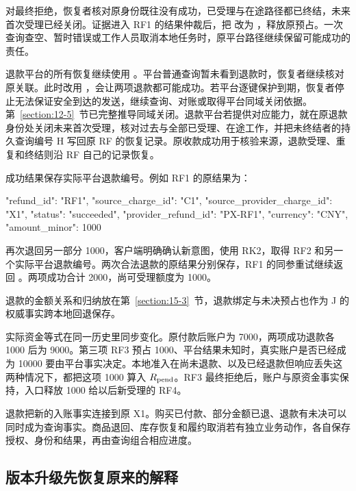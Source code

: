 对最终拒绝，恢复者核对原身份既往没有成功，已受理与在途路径都已终结，未来首次受理已经关闭。证据进入 RF1 的结果仲裁后，把  改为 ，释放原预占。一次查询查空、暂时错误或工作人员取消本地任务时，原平台路径继续保留可能成功的责任。


退款平台的所有恢复继续使用 。平台普通查询暂未看到退款时，恢复者继续核对原关联。此时改用 ，会让两项退款都可能成功。若平台逐键保护到期，恢复者停止无法保证安全到达的发送，继续查询、对账或取得平台同域关闭依据。第~\ref{section:12-5}~节已完整推导同域关闭。退款平台若提供对应能力，就在原退款身份处关闭未来首次受理，核对过去与全部已受理、在途工作，并把未终结者的持久查询编号 H 写回原 RF 的恢复记录。原收款成功用于核验来源，退款受理、重复和终结则沿 RF 自己的记录恢复。

成功结果保存实际平台退款编号。例如 RF1 的原结果为：

\begin{BookCode}
{
  "refund_id": "RF1",
  "source_charge_id": "C1",
  "source_provider_charge_id": "X1",
  "status": "succeeded",
  "provider_refund_id": "PX-RF1",
  "currency": "CNY",
  "amount_minor": 1000
}
\end{BookCode}

再次退回另一部分 1000，客户端明确确认新意图，使用 RK2，取得 RF2 和另一个实际平台退款编号。两次合法退款的原结果分别保存，RF1 的同参重试继续返回 。两项成功合计 2000，尚可受理额度为 1000。

退款的金额关系和归纳放在第~\ref{section:15-3}~节，退款绑定与未决预占也作为 J 的权威事实跨本地回退保存。

实际资金等式在同一历史里同步变化。原付款后账户为 7000，两项成功退款各 1000 后为 9000。第三项 RF3 预占 1000、平台结果未知时，真实账户是否已经成为 10000 要由平台事实决定。本地准入在尚未退款、以及已经退款但响应丢失这两种情况下，都把这项 1000 算入 $R_{\rm pend}$。RF3 最终拒绝后，账户与原资金事实保持，入口释放 1000 给以后新受理的 RF4。

退款把新的入账事实连接到原 X1。购买已付款、部分金额已退、退款有未决可以同时成为查询事实。商品退回、库存恢复和履约取消若有独立业务动作，各自保存授权、身份和结果，再由查询组合相应进度。

\subsection*{版本升级先恢复原来的解释}

